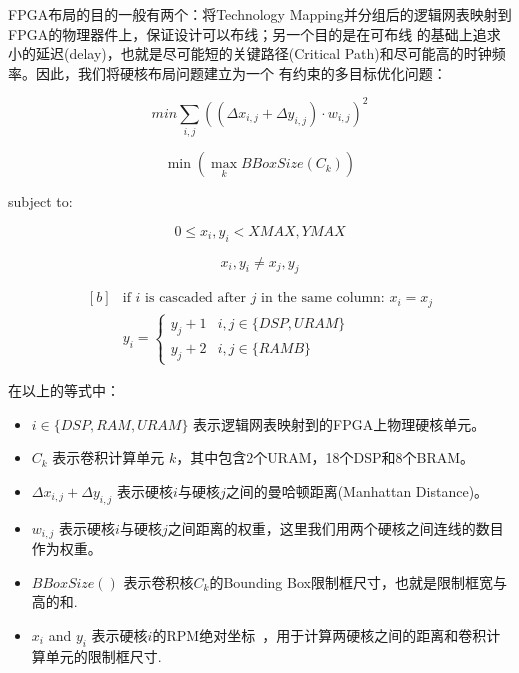 FPGA布局的目的一般有两个：将Technology Mapping并分组后的逻辑网表映射到FPGA的物理器件上，保证设计可以布线；另一个目的是在可布线
的基础上追求小的延迟(delay)，也就是尽可能短的关键路径(Critical Path)和尽可能高的时钟频率。因此，我们将硬核布局问题建立为一个
有约束的多目标优化问题：


\begin{equation} \label{eq:obj1}
	min \sum_{i,j} ((\Delta{x_{i,j}} + \Delta{y_{i,j}}) \cdot w_{i,j})^2 
\end{equation}

\begin{equation} \label{eq:obj2}
	 \min (\max_{k} BBoxSize(C_k))
\end{equation}

subject to:

\begin{equation} \label{eq:region}
  0 \leq x_i,y_i < XMAX,YMAX
\end{equation}


\begin{equation} \label{eq:overlap}
    {x_i,y_i} \neq {x_j,y_j}
\end{equation}

\begin{equation} \label{eq:cascade}
  \begin{aligned}[b]
	& \textrm{if } i \textrm{ is cascaded after } j \textrm{ in the same column: }
  x_i = x_j \\
	& y_i =
	\begin{cases}
		 y_j + 1  & i, j \in \{  DSP, URAM  \} \\
		 y_j + 2  & i, j \in \{  RAMB \}
	\end{cases}
\end{aligned}
\end{equation}

在以上的等式中：
\begin{itemize}
	\item $i \in \{ DSP, RAM, URAM \} $ 表示逻辑网表映射到的FPGA上物理硬核单元。
	\item $C_k$ 表示卷积计算单元 $k$，其中包含2个URAM，18个DSP和8个BRAM。 
	\item $\Delta{x_{i,j}} + \Delta{y_{i,j}}$ 表示硬核$i$与硬核$j$之间的曼哈顿距离(Manhattan Distance)。
	\item $w_{i,j}$ 表示硬核$i$与硬核$j$之间距离的权重，这里我们用两个硬核之间连线的数目作为权重。
	\item $BBoxSize()$ 表示卷积核$C_k$的Bounding Box限制框尺寸，也就是限制框宽与高的和. 
	\item $x_i$ and $y_i$ 表示硬核$i$的RPM绝对坐标~\cite{ug903}，用于计算两硬核之间的距离和卷积计算单元的限制框尺寸.
\end{itemize}

